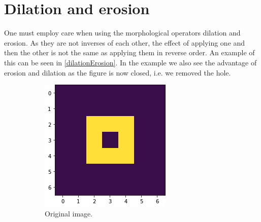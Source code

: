 \section{Dilation and erosion}
One must employ care when using the morphological operators dilation and erosion. As they are not inverses of each other, the effect of applying one and then the other is not the same as applying them in reverse order. An example of this can be seen in \autoref{dilationErosion}. In the example we also see the advantage of erosion and dilation as the figure is now closed, i.e. we removed the hole.

\begin{figure}[h]
	\centering
	\begin{subfigure}{0.3\linewidth}
		\centering
		\includegraphics[width=\linewidth]{Materials/morphOrg}
		\caption{Original image.\newline}
	\end{subfigure}
	\hfill
	\begin{subfigure}{0.3\linewidth}
		\centering

\end{subfigure}
\end{figure}
